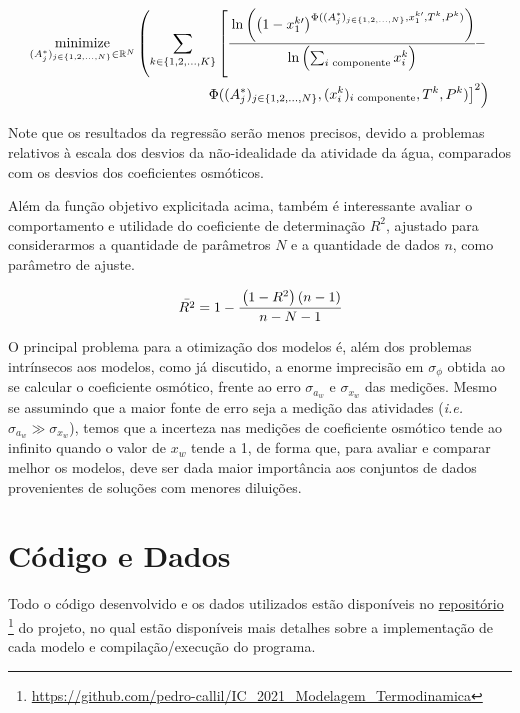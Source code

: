 \documentclass[
	12pt,				%
	openright,
	twoside,
	a4paper,			%
	english,			%
	french,				%
	spanish,			%
	brazil				%
	]{abntex2}
\DeclareMathOperator*{\minimize}{minimize}
\begin{document}
\begin{equation}
	\label{eq:min_quad_lev_stokes}
	\begin{split}
		\minimize_{(A_j^*)_{j \in \{1,2,\ldots,N\}} \in \mathbb{R}^N}%
		\left(\sum_{k \in \{1,2,\ldots,K\}}\left[%
		\cfrac{\ln\left(\left(1-x_1^{k\prime}\right)^{\Phi((A^*_j)_{j%
		\in \{1,2,\ldots,N\}},x^{k\prime}_1,T^k,P^k)}\right)}%
		{\ln\left(\sum_\text{$i$ componente}x_i^k\right)}%
		-\right.\right.\\
		\left.\left.\Phi((A^*_j)_{j%
		\in \{1, 2, \ldots, N\}}, (x^k_i)_\text{$i$ componente},%
		T^k, P^k)\right]^2\right)
	\end{split}
\end{equation}

Note que os resultados da regressão serão menos precisos, devido a problemas
relativos à escala dos desvios da não-idealidade da atividade da água, comparados
com os desvios dos coeficientes osmóticos.

Além da função objetivo explicitada acima, também é interessante avaliar o
comportamento e utilidade do coeficiente de determinação $R^2$, ajustado para
considerarmos a quantidade de parâmetros $N$ e a quantidade de dados $n$, como
parâmetro de ajuste.

\begin{equation}
	\bar{R^2} = 1 - \cfrac{\left( 1 - R^2 \right) \left( n - 1 \right)}
		{n - N - 1}
\end{equation}

O principal problema para a otimização dos modelos é, além dos problemas
intrínsecos aos modelos, como já discutido, a enorme imprecisão em
$\sigma_\phi$ obtida ao se calcular o coeficiente osmótico, frente ao erro
$\sigma_{a_w}$ e $\sigma_{x_w}$ das medições. Mesmo se assumindo que a maior
fonte de erro seja a medição das atividades (\textit{i.e.} $\sigma_{a_w} \gg
\sigma_{x_w}$), temos que a incerteza nas medições de coeficiente osmótico
tende ao infinito quando o valor de $x_w$ tende a 1, de forma que, para avaliar
e comparar melhor os modelos, deve ser dada maior importância aos conjuntos
de dados provenientes de soluções com menores diluições.

\section{Código e Dados}

Todo o código desenvolvido e os dados utilizados estão disponíveis no
\href{https://github.com/pedro-callil/IC_2021_Modelagem_Termodinamica}{repositório}
\footnote{\url{https://github.com/pedro-callil/IC_2021_Modelagem_Termodinamica}}
do projeto, no qual estão disponíveis mais detalhes sobre a implementação de
cada modelo e compilação/execução do programa.
\end{document}
